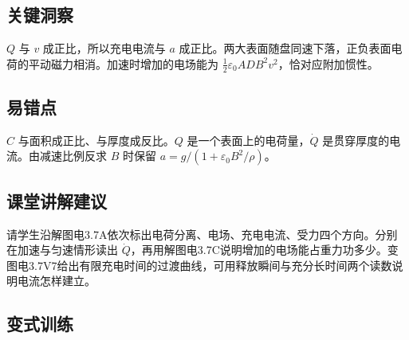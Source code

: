 \documentclass[UTF8,fontset=fandol,a4paper,11pt]{ctexart}
\begin{document}


\subsection*{关键洞察}

$Q$ 与 $v$ 成正比，所以充电电流与 $a$ 成正比。两大表面随盘同速下落，正负表面电荷的平动磁力相消。加速时增加的电场能为 $\frac12\varepsilon_0ADB^2v^2$，恰对应附加惯性。



\subsection*{易错点}

$C$ 与面积成正比、与厚度成反比。$Q$ 是一个表面上的电荷量，$\dot Q$ 是贯穿厚度的电流。由减速比例反求 $B$ 时保留 $a=g/(1+\varepsilon_0B^2/\rho)$。



\subsection*{课堂讲解建议}

请学生沿解图电3.7A依次标出电荷分离、电场、充电电流、受力四个方向。分别在加速与匀速情形读出 $\dot Q$，再用解图电3.7C说明增加的电场能占重力功多少。变图电3.7V7给出有限充电时间的过渡曲线，可用释放瞬间与充分长时间两个读数说明电流怎样建立。


\subsection*{变式训练}
\end{document}
